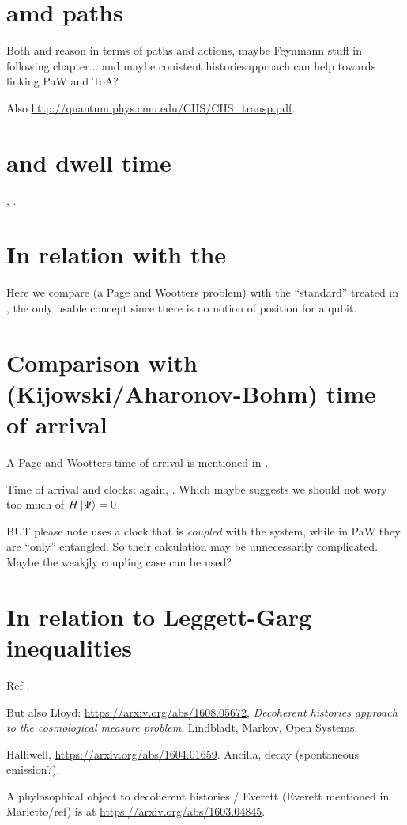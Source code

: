 \section{amd paths}

Both \cite{YearsleyHalliwell_Clocks} and \cite{Gambini_PW}
reason in terms of paths and actions, maybe Feynmann stuff
in following chapter... and maybe conistent historiesapproach can help
towards linking PaW and ToA?

Also \url{http://quantum.phys.cmu.edu/CHS/CHS_transp.pdf}.

\section{and dwell time}

\cite[\S 5]{TQM2}, \cite{YearsleyHalliwell_Clocks}.

\section{In relation with the }

Here we compare \cite{Moreva:synthetic, Moreva:illustration}
(a Page and Wootters problem)
with the ``standard'' 
treated in \cite[\S 5.5.2]{TQM2},
the only usable concept since there is no notion of position
for a qubit.

\section{Comparison with (Kijowski/Aharonov-Bohm) time of arrival}

A Page and Wootters time of arrival is mentioned in \cite{Gambini_PW}.

Time of arrival and clocks: again, \cite{YearsleyHalliwell_Clocks}.
Which maybe suggests we should not wory too much of $H\ket{\Psi} = 0$. 

BUT please note \cite{YearsleyHalliwell_Clocks} uses a clock that is
\emph{coupled} with the system, while in PaW they are ``only'' entangled.
So their calculation may be unnecessarily complicated.
Maybe the weakjly coupling case can be used?

\section{In relation to Leggett-Garg inequalities}
Ref \cite{LeggettGarg+PageWootters}.

But also Lloyd: \url{https://arxiv.org/abs/1608.05672},
\emph{Decoherent histories approach to the cosmological measure problem}.
Lindbladt, Markov, Open Systems.

Halliwell, \url{https://arxiv.org/abs/1604.01659}. Ancilla, decay (spontaneous emission?).

A phylosophical object to decoherent histories / Everett (Everett mentioned in Marletto/ref)
is at
\url{https://arxiv.org/abs/1603.04845}.

